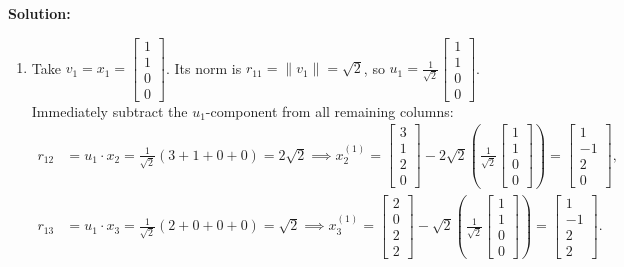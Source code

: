 \documentclass[11pt, letterpaper]{article}
\theoremstyle{definition}
\theoremstyle{remark}
\begin{document}
\textbf{Solution:}
\begin{enumerate}[label=\textbf{Stage \arabic*:}]
    \item Take $v_1 = x_1 = \begin{bmatrix} 1 \\ 1 \\ 0 \\ 0 \end{bmatrix}$. Its norm is $r_{11} = \|v_1\| = \sqrt{2}$, so $u_1 = \frac{1}{\sqrt{2}}\begin{bmatrix} 1 \\ 1 \\ 0 \\ 0 \end{bmatrix}$. Immediately subtract the $u_1$-component from all remaining columns:
    \begin{align*}
        r_{12} &= u_1 \cdot x_2 = \frac{1}{\sqrt{2}}(3 + 1 + 0 + 0) = 2\sqrt{2} \implies x_2^{(1)} = \begin{bmatrix} 3 \\ 1 \\ 2 \\ 0 \end{bmatrix} - 2\sqrt{2}\left(\frac{1}{\sqrt{2}}\begin{bmatrix} 1 \\ 1 \\ 0 \\ 0 \end{bmatrix}\right) = \begin{bmatrix} 1 \\ -1 \\ 2 \\ 0 \end{bmatrix}, \\
        r_{13} &= u_1 \cdot x_3 = \frac{1}{\sqrt{2}}(2 + 0 + 0 + 0) = \sqrt{2} \implies x_3^{(1)} = \begin{bmatrix} 2 \\ 0 \\ 2 \\ 2 \end{bmatrix} - \sqrt{2}\left(\frac{1}{\sqrt{2}}\begin{bmatrix} 1 \\ 1 \\ 0 \\ 0 \end{bmatrix}\right) = \begin{bmatrix} 1 \\ -1 \\ 2 \\ 2 \end{bmatrix}.

\end{align*}
\end{enumerate}
\end{document}
